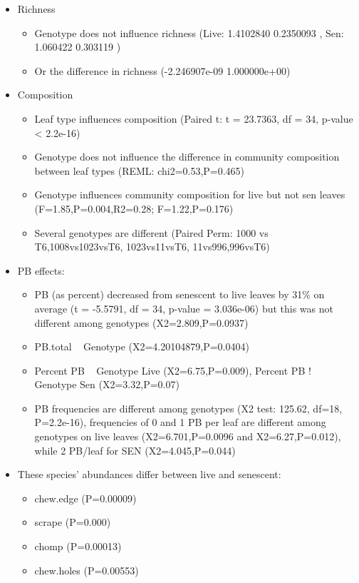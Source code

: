 \documentclass[12pt]{article}
\begin{document}
\begin{itemize}
\item Richness
  \begin{itemize}
  \item Genotype does not influence richness (Live: 1.4102840
    0.2350093 , Sen: 1.060422 0.303119 )
  \item Or the difference in richness (-2.246907e-09  1.000000e+00)
  \end{itemize}
\item Composition
  \begin{itemize}
  \item Leaf type influences composition (Paired t: t = 23.7363, df = 34, p-value < 2.2e-16)
  \item Genotype does not influence the difference in community
    composition between leaf types (REML: chi2=0.53,P=0.465)
  \item Genotype influences community composition for live but not sen
    leaves (F=1.85,P=0.004,R2=0.28; F=1.22,P=0.176)
  \item Several genotypes are different (Paired Perm: 1000 vs
    T6,1008vs1023vsT6, 1023vs11vsT6, 11vs996,996vsT6)
  \end{itemize}
\item PB effects: 
  \begin{itemize}
  \item PB (as percent) decreased from senescent to live leaves by 31\% on average
    (t = -5.5791, df = 34, p-value = 3.036e-06) but this was not
    different among genotypes (X2=2.809,P=0.0937)
  \item PB.total ~ Genotype (X2=4.20104879,P=0.0404) 
  \item Percent PB ~ Genotype Live (X2=6.75,P=0.009), Percent PB !~ Genotype Sen (X2=3.32,P=0.07)
  \item PB frequencies are different among genotypes (X2 test: 125.62,
    df=18, P=2.2e-16), frequencies of 0 and 1 PB per leaf are
    different among genotypes on live leaves (X2=6.701,P=0.0096 and
    X2=6.27,P=0.012), while 2 PB/leaf for SEN (X2=4.045,P=0.044)
  \end{itemize}
\item These species' abundances differ between live and senescent:
  \begin{itemize}
  \item chew.edge (P=0.00009)
  \item scrape (P=0.000)
  \item chomp (P=0.00013)
  \item chew.holes (P=0.00553)

\end{itemize}
\end{itemize}
\end{document}
